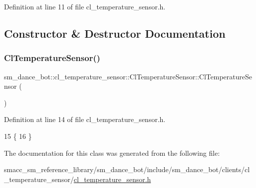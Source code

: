 Definition at line 11 of file cl\+\_\+temperature\+\_\+sensor.\+h.



\subsection{Constructor \& Destructor Documentation}
\mbox{\label{classsm__dance__bot_1_1cl__temperature__sensor_1_1ClTemperatureSensor_ac2e5d27f5110bc19393890214429d0bf}} 
\subsubsection{\texorpdfstring{Cl\+Temperature\+Sensor()}{ClTemperatureSensor()}}
{\footnotesize\ttfamily sm\+\_\+dance\+\_\+bot\+::cl\+\_\+temperature\+\_\+sensor\+::\+Cl\+Temperature\+Sensor\+::\+Cl\+Temperature\+Sensor (\begin{DoxyParamCaption}{ }\end{DoxyParamCaption})\hspace{0.3cm}{\ttfamily [inline]}}



Definition at line 14 of file cl\+\_\+temperature\+\_\+sensor.\+h.


\begin{DoxyCode}
15     \{
16     \}
\end{DoxyCode}


The documentation for this class was generated from the following file\+:\begin{DoxyCompactItemize}
\item 
smacc\+\_\+sm\+\_\+reference\+\_\+library/sm\+\_\+dance\+\_\+bot/include/sm\+\_\+dance\+\_\+bot/clients/cl\+\_\+temperature\+\_\+sensor/\hyperlink{include_2sm__dance__bot_2clients_2cl__temperature__sensor_2cl__temperature__sensor_8h}{cl\+\_\+temperature\+\_\+sensor.\+h}\end{DoxyCompactItemize}
